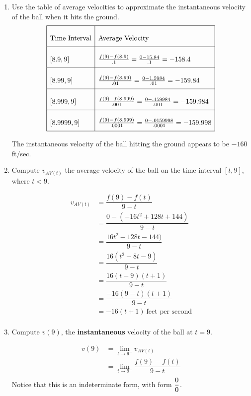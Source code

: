 \documentclass{ximera}
\begin{document}
\begin{problem}
\begin{enumerate}
		\item  Use the table of average velocities to approximate the instantaneous velocity of the ball when it hits the ground.
			 \[
			\renewcommand*{\arraystretch}{2.5}	
			\begin{array}{|l|l|}
			\hline
			\text{Time Interval} & \text{Average Velocity}  \\
			\hline
			[8.9, 9] & \frac{f(9)-f(8.9)}{.1}=\frac{0-15.84}{.1}=-158.4  \\
			\hline
			[8.99,9] & \frac{f(9)-f(8.99)}{.01}=\frac{0-1.5984}{.01}=-159.84 \\
			\hline
			[8.999, 9] & \frac{f(9)-f(8.999)}{.001}=\frac{0-.159984}{.001}=-159.984 \\
			\hline
			[8.9999, 9] &  \frac{f(9)-f(8.999)}{.0001}=\frac{0-.0159998}{.0001}=-159.998  \\
			\hline
			\end{array} 
			\]
		

		\begin{explanation}
		 The instantaneous velocity of the ball hitting the ground appears to be $-160$ ft/sec.
		\end{explanation}
		
		\item   Compute $v_{AV(t)}$ the average velocity of the ball on the time interval  $[t, 9]$, where $t<9$.

		\begin{explanation}
		
		\begin{align*}		 
		v_{AV(t)}&=\dfrac{f(9)-f(t)}{9-t}\\
		&=\dfrac{0-(-16t^2+128t+144)}{9-t}\\
		&=\dfrac{16t^2-128t-144)}{9-t}\\
         &=\dfrac{16(t^2-8t-9 )}{9-t}\\
         &=\dfrac{16(t-9)(t+1)}{9-t}\\
          &=\dfrac{-16(9-t)(t+1)}{9-t}\\
            &=-16(t+1)\  \text{feet per second}\\
            	\end{align*}
	\end{explanation}
\item   Compute $v(9)$, the \textbf{instantaneous} velocity of the ball at $t=9$.

		\begin{explanation}

		\begin{align*}		 
		v(9)&=\lim_{t \to 9^{-}}v_{AV(t)}\\
		&=\lim_{t \to 9^{-}}\dfrac{f(9)-f(t)}{9-t}\\
		\end{align*}
		Notice that this is an indeterminate form, with form $\dfrac{0}{0}$.
				

\end{explanation}
\end{enumerate}
\end{problem}
\end{document}
